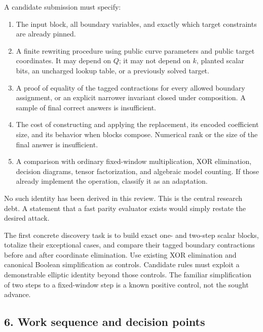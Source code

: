 \documentclass[
  10pt,
]{article}
\providecommand{\tightlist}{%
  \setlength{\itemsep}{0pt}\setlength{\parskip}{0pt}}
\begin{document}
A candidate submission must specify:

\begin{enumerate}
\def\labelenumi{\arabic{enumi}.}
\tightlist
\item
  The input block, all boundary variables, and exactly which target
  constraints are already pinned.
\item
  A finite rewriting procedure using public curve parameters and public
  target coordinates. It may depend on \(Q\); it may not depend on
  \(k\), planted scalar bits, an uncharged lookup table, or a previously
  solved target.
\item
  A proof of equality of the tagged contractions for every allowed
  boundary assignment, or an explicit narrower invariant closed under
  composition. A sample of final correct answers is insufficient.
\item
  The cost of constructing and applying the replacement, its encoded
  coefficient size, and its behavior when blocks compose. Numerical rank
  or the size of the final answer is insufficient.
\item
  A comparison with ordinary fixed-window multiplication, XOR
  elimination, decision diagrams, tensor factorization, and algebraic
  model counting. If those already implement the operation, classify it
  as an adaptation.
\end{enumerate}

No such identity has been derived in this review. This is the central
research debt. A statement that a fast parity evaluator exists would
simply restate the desired attack.

The first concrete discovery task is to build exact one- and two-step
scalar blocks, totalize their exceptional cases, and compare their
tagged boundary contractions before and after coordinate elimination.
Use existing XOR elimination and canonical Boolean simplification as
controls. Candidate rules must exploit a demonstrable elliptic identity
beyond those controls. The familiar simplification of two steps to a
fixed-window step is a known positive control, not the sought advance.

\subsection{6. Work sequence and decision
points}\label{work-sequence-and-decision-points}
\end{document}
